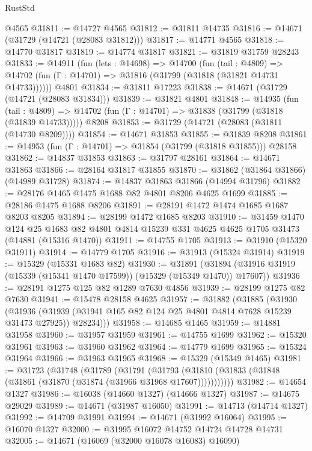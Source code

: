\begin{lexlean}{RustStd}
\begin{coremodule}
    @4565
@31811 := @14727 @4565
@31812 := @31811 @14735
@31816 := @14671 (@31729 (@14721 (@28083 @31812)))
@31817 := @14771 @4565
@31818 := @14770 @31817
@31819 := @14774 @31817
@31821 := @31819 @31759 @28243
@31833 := @14911
    (fun (lets : @14698) =>
    @14700
      (fun (tail : @4809) =>
      @14702 (fun (Γ : @14701) => @31816 (@31799 (@31818 (@31821 @14731 @14733))))))
    @4801
@31834 := @31811 @17223
@31838 := @14671 (@31729 (@14721 (@28083 @31834)))
@31839 := @31821 @4801
@31848 := @14935
    (fun (tail : @4809) => @14702 (fun (Γ : @14701) => @31838 (@31799 (@31818 (@31839 @14733)))))
    @8208
@31853 := @31729 (@14721 (@28083 (@31811 (@14730 @8209))))
@31854 := @14671 @31853
@31855 := @31839 @8208
@31861 := @14953 (fun (Γ : @14701) => @31854 (@31799 (@31818 @31855))) @28158
@31862 := @14837 @31853
@31863 := @31797 @28161
@31864 := @14671 @31863
@31866 := @28164 @31817 @31855
@31870 := @31862 (@31864 @31866) (@14989 @31728)
@31874 := @14837 @31863 @31866 (@14994 @31796)
@31882 := @28176 @1465 @1475 @1688 @82 @4801 @8206 @4625 @1699
@31885 := @28186 @1475 @1688 @8206
@31891 := @28191 @1472 @1474 @1685 @1687 @8203 @8205
@31894 := @28199 @1472 @1685 @8203
@31910 := @31459
    @1470
    @124
    @25
    @1683
    @82
    @4801
    @4814
    @15239
    @331
    @4625
    @4625
    @1705
    @31473
    (@14881 (@15316 @1470))
@31911 := @14755 @1705
@31913 := @31910 (@15320 @31911)
@31914 := @14779 @1705
@31916 := @31913 (@15324 @31914)
@31919 := @15329 (@15331 @1683 @82)
@31930 := @31891
    (@31894 (@31916 @31919 (@15339 (@15341 @1470 @17599)) (@15329 (@15349 @1470)) @17607))
@31936 := @28191 @1275 @125 @82 @1289 @7630 @4856
@31939 := @28199 @1275 @82 @7630
@31941 := @15478 @28158 @4625
@31957 := @31882
    (@31885
      (@31930
        (@31936 (@31939 (@31941 @165 @82 @124 @25 @4801 @4814 @7628 @15239 @31473 @27925)) @28234)))
@31958 := @14685 @1465
@31959 := @14881 @31958
@31960 := @31957 @31959
@31961 := @14755 @1699
@31962 := @15320 @31961
@31963 := @31960 @31962
@31964 := @14779 @1699
@31965 := @15324 @31964
@31966 := @31963 @31965
@31968 := @15329 (@15349 @1465)
@31981 := @31723
    (@31748
      (@31789
        (@31791
          (@31793 (@31810 (@31833 (@31848 (@31861 (@31870 (@31874 (@31966 @31968 @17607)))))))))))
@31982 := @14654 @1327
@31986 := @16038 (@14660 @1327) (@14666 @1327)
@31987 := @14675 @29029
@31989 := @14671 (@31987 @16050)
@31991 := @14713 (@14714 @1327)
@31992 := @14709 @31991
@31994 := @14671 (@31992 @16064)
@31995 := @16070 @1327
@32000 := @31995 @16072 @14752 @14724 @14728 @14731
@32005 := @14671 (@16069 (@32000 @16078 @16083) @16090)

\end{coremodule}
\end{lexlean}
